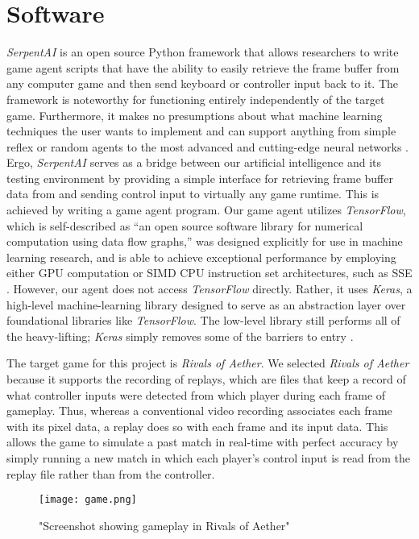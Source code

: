 \section{Software}

{\it SerpentAI} is an open source Python framework that allows researchers to write game agent scripts that have the ability to easily retrieve the frame buffer from any computer game and then send keyboard or controller input back to it. The framework is noteworthy for functioning entirely independently of the target game. Furthermore, it makes no presumptions about what machine learning techniques the user wants to implement and can support anything from simple reflex or random agents to the most advanced and cutting-edge neural networks \cite{SerpentAI}. Ergo, {\it SerpentAI} serves as a bridge between our artificial intelligence and its testing environment by providing a simple interface for retrieving frame buffer data from and sending control input to virtually any game runtime. This is achieved by writing a game agent program. Our game agent utilizes {\it TensorFlow}, which is self-described as ``an open source software library for numerical computation using data flow graphs,'' was designed explicitly for use in machine learning research, and is able to achieve exceptional performance by employing either GPU computation or SIMD CPU instruction set architectures, such as SSE \cite{TensorFlow}. However, our agent does not access {\it TensorFlow} directly. Rather, it uses {\it Keras}, a high-level machine-learning library designed to serve as an abstraction layer over foundational libraries like {\it TensorFlow}. The low-level library still performs all of the heavy-lifting; {\it Keras} simply removes some of the barriers to entry \cite{Keras}.

The target game for this project is {\it Rivals of Aether}. We selected {\it Rivals of Aether} because it supports the recording of replays, which are files that keep a record of what controller inputs were detected from which player during each frame of gameplay. Thus, whereas a conventional video recording associates each frame with its pixel data, a replay does so with each frame and its input data. This allows the game to simulate a past match in real-time with perfect accuracy by simply running a new match in which each player's control input is read from the replay file rather than from the controller.

\begin{figure}
	\caption{"Screenshot showing gameplay in Rivals of Aether"}
	\centering
	\texttt{[image: game.png]} \\
\end{figure}

